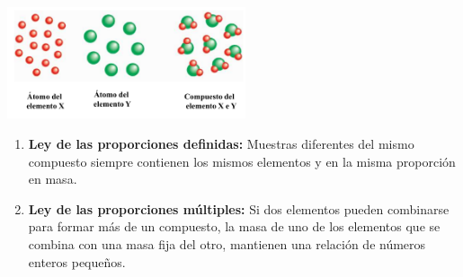             \begin{center} \includegraphics[width=7cm]{./imagenes/teoriaAtomicaDalton.png} \end{center}
            
            \begin{enumerate} 
                \item \textbf{Ley de las proporciones definidas:} Muestras diferentes del mismo compuesto siempre contienen los mismos elementos y en la misma proporción en masa.
                \item \textbf{Ley de las proporciones múltiples:} Si dos elementos pueden combinarse para formar más de un compuesto, la masa de uno de los elementos que se combina con una masa fija del otro, mantienen una relación de números enteros pequeños.
            \end{enumerate}
        
